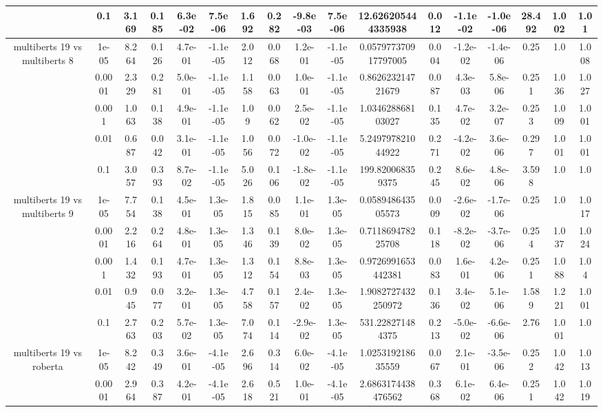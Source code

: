 \begin{tabular}{|c|c|c|c|c|c|c|c|c|c|c|c|c|c|c|c|c|}
 & 0.1 & 3.169 & 0.185 & 6.3e-02 & 7.5e-06 & 1.692 & 0.282 & -9.8e-03 & 7.5e-06 & 12.626205444335938 & 0.012 & -1.1e-02 & -1.0e-06 & 28.492 & 1.002 & 1.01 \\
\hline
\multirow{5}{*}{multiberts 19 vs multiberts 8} & 1e-05 & 8.264 & 0.126 & 4.7e-01 & -1.1e-05 & 2.012 & 0.068 & 1.2e-01 & -1.1e-05 & 0.057977370917797005 & 0.004 & -1.2e-02 & -1.4e-06 & 0.25 & 1.0 & 1.008 \\
 & 0.0001 & 2.329 & 0.281 & 5.0e-01 & -1.1e-05 & 1.158 & 0.063 & 1.0e-01 & -1.1e-05 & 0.862623214721679 & 0.087 & 4.3e-03 & 5.8e-06 & 0.251 & 1.036 & 1.027 \\
 & 0.001 & 1.063 & 0.138 & 4.9e-01 & -1.1e-05 & 1.09 & 0.062 & 2.5e-02 & -1.1e-05 & 1.034628868103027 & 0.135 & 4.7e-02 & 3.2e-07 & 0.253 & 1.009 & 1.001 \\
 & 0.01 & 0.687 & 0.042 & 3.1e-01 & -1.1e-05 & 1.056 & 0.072 & -1.0e-02 & -1.1e-05 & 5.249797821044922 & 0.271 & -4.2e-02 & 3.6e-06 & 0.297 & 1.001 & 1.001 \\
 & 0.1 & 3.057 & 0.393 & 8.7e-02 & -1.1e-05 & 5.026 & 0.106 & -1.8e-02 & -1.1e-05 & 199.820068359375 & 0.245 & 8.6e-02 & 4.8e-06 & 3.598 & 1.0 & 1.0 \\
\hline
\multirow{5}{*}{multiberts 19 vs multiberts 9} & 1e-05 & 7.754 & 0.138 & 4.5e-01 & 1.3e-05 & 1.815 & 0.085 & 1.1e-01 & 1.3e-05 & 0.058948643505573 & 0.009 & -2.6e-02 & -1.7e-06 & 0.25 & 1.0 & 1.017 \\
 & 0.0001 & 2.216 & 0.264 & 4.8e-01 & 1.3e-05 & 1.346 & 0.139 & 8.0e-02 & 1.3e-05 & 0.711869478225708 & 0.118 & -8.2e-02 & -3.7e-06 & 0.254 & 1.037 & 1.024 \\
 & 0.001 & 1.432 & 0.193 & 4.7e-01 & 1.3e-05 & 1.312 & 0.154 & 8.8e-03 & 1.3e-05 & 0.9726991653442381 & 0.083 & 1.6e-01 & 4.2e-06 & 0.251 & 1.088 & 1.04 \\
 & 0.01 & 0.945 & 0.077 & 3.2e-01 & 1.3e-05 & 4.758 & 0.157 & 2.4e-02 & 1.3e-05 & 1.9082727432250972 & 0.136 & 3.4e-02 & 5.1e-06 & 1.589 & 1.221 & 1.001 \\
 & 0.1 & 2.763 & 0.203 & 5.7e-02 & 1.3e-05 & 7.074 & 0.114 & -2.9e-02 & 1.3e-05 & 531.228271484375 & 0.213 & -5.0e-02 & -6.6e-06 & 2.76 & 1.001 & 1.0 \\
\hline
\multirow{5}{*}{multiberts 19 vs roberta } & 1e-05 & 8.242 & 0.349 & 3.6e-01 & -4.1e-05 & 2.696 & 0.314 & 6.0e-02 & -4.1e-05 & 1.025319218635559 & 0.067 & 2.1e-01 & -3.5e-06 & 0.252 & 1.042 & 1.013 \\
 & 0.0001 & 2.964 & 0.387 & 4.2e-01 & -4.1e-05 & 2.618 & 0.521 & 1.0e-01 & -4.1e-05 & 2.6863174438476562 & 0.368 & 6.1e-02 & 6.4e-06 & 0.251 & 1.042 & 1.019 \\

\end{tabular}
